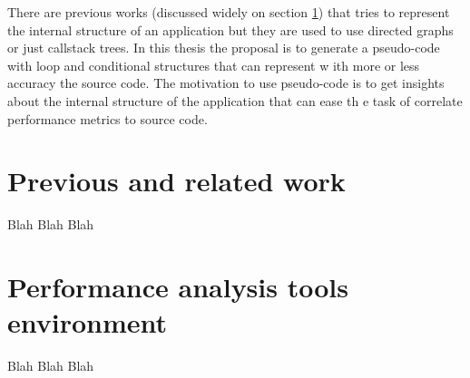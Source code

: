 \documentclass[12pt]{report}
\begin{document}
There are previous works (discussed widely on section \ref{related_work})  that 
tries to represent the internal structure of an application but they are used to
 use directed graphs or just callstack trees. In this thesis the proposal is to 
generate a pseudo-code with loop and conditional structures that can represent w
ith more or less accuracy the source code. The motivation to use pseudo-code is 
to get insights about the internal structure of the application that can ease th
e task of correlate performance metrics to source code.

\section{Previous and related work}\label{related_work}

Blah Blah Blah

\section{Performance analysis tools environment}

Blah Blah Blah





\end{document}

